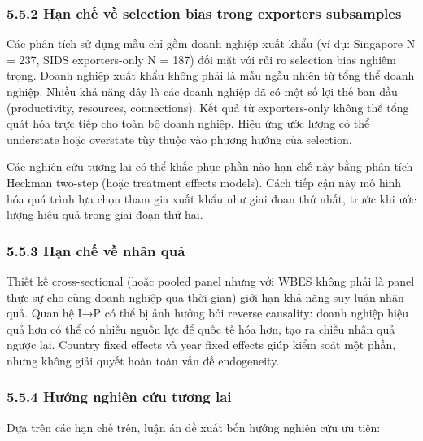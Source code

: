 \documentclass[12pt,a4paper]{article}
\begin{document}
\hypertarget{552-hux1ea1n-chux1ebf-vux1ec1-selection-bias-trong-exporters-subsamples}{%
\subsubsection{5.5.2 Hạn chế về selection bias trong exporters
subsamples}\label{552-hux1ea1n-chux1ebf-vux1ec1-selection-bias-trong-exporters-subsamples}}

Các phân tích sử dụng mẫu chỉ gồm doanh nghiệp xuất khẩu (ví dụ:
Singapore N = 237, SIDS exporters-only N = 187) đối mặt với rủi ro
selection bias nghiêm trọng. Doanh nghiệp xuất khẩu không phải là mẫu
ngẫu nhiên từ tổng thể doanh nghiệp. Nhiều khả năng đây là các doanh
nghiệp đã có một số lợi thế ban đầu (productivity, resources,
connections). Kết quả từ exporters-only không thể tổng quát hóa trực
tiếp cho toàn bộ doanh nghiệp. Hiệu ứng ước lượng có thể understate hoặc
overstate tùy thuộc vào phương hướng của selection.

Các nghiên cứu tương lai có thể khắc phục phần nào hạn chế này bằng phân
tích Heckman two-step (hoặc treatment effects models). Cách tiếp cận này
mô hình hóa quá trình lựa chọn tham gia xuất khẩu như giai đoạn thứ
nhất, trước khi ước lượng hiệu quả trong giai đoạn thứ hai.

\hypertarget{553-hux1ea1n-chux1ebf-vux1ec1-nhuxe2n-quux1ea3}{%
\subsubsection{5.5.3 Hạn chế về nhân
quả}\label{553-hux1ea1n-chux1ebf-vux1ec1-nhuxe2n-quux1ea3}}

Thiết kế cross-sectional (hoặc pooled panel nhưng với WBES không phải là
panel thực sự cho cùng doanh nghiệp qua thời gian) giới hạn khả năng suy
luận nhân quả. Quan hệ I→P có thể bị ảnh hưởng bởi reverse causality:
doanh nghiệp hiệu quả hơn có thể có nhiều nguồn lực để quốc tế hóa hơn,
tạo ra chiều nhân quả ngược lại. Country fixed effects và year fixed
effects giúp kiểm soát một phần, nhưng không giải quyết hoàn toàn vấn đề
endogeneity.

\hypertarget{554-hux1b0ux1edbng-nghiuxean-cux1ee9u-tux1b0ux1a1ng-lai}{%
\subsubsection{5.5.4 Hướng nghiên cứu tương
lai}\label{554-hux1b0ux1edbng-nghiuxean-cux1ee9u-tux1b0ux1a1ng-lai}}

Dựa trên các hạn chế trên, luận án đề xuất bốn hướng nghiên cứu ưu tiên:
\end{document}
